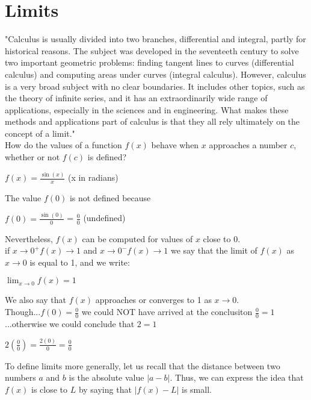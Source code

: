 \documentclass{article}
\begin{document}
\section* {Limits}

"Calculus is usually divided into two branches, differential and integral, partly for historical reasons. The subject was developed in the seventeeth century to solve two important geometric problems: finding tangent lines to curves (differential calculus) and computing areas under curves (integral calculus). However, calculus is a very broad subject with no clear boundaries. It includes other topics, such as the theory of infinite series, and it has an extraordinarily wide range of applications, especially in the sciences and in engineering. What makes these methods and applications part of calculus is that they all rely ultimately on the concept of a limit."\\

\noindent How do the values of a function $f(x)$ behave when $x$ approaches a number $c$, whether or not $f(c)$ is defined?\\

\begin{center}$f(x) = \frac{\sin(x)}{x}$ (x in radians)\end{center}
The value $f(0)$ is not defined because
\begin{center}$f(0) = \frac{\sin(0)}{0}$ = $\frac{0}{0}$ (undefined)\end{center}
Nevertheless, $f(x)$ can be computed for values of $x$ close to 0.\\

if $x \to 0^+ f(x) \to 1$ and $x \to 0^- f(x) \to 1$ we say that the limit of $f(x)$ as $x \to 0$ is equal to 1, and we write:
\begin{center}$\lim_{x \to 0}f(x) = 1$\end{center}
We also say that $f(x)$ approaches or converges to 1 as $x \to 0$.\\

\noindent Though...$f(0) = \frac{0}{0}$ we could NOT have arrived at the conclusiton $\frac{0}{0} = 1$...otherwise we could conclude that $2=1$
\begin{center}$2(\frac{0}{0}) = \frac{2(0)}{0} = \frac{0}{0}$\end{center}

To define limits more generally, let us recall that the distance between two numbers $a$ and $b$ is the absolute value $\left|a-b\right|$. Thus, we can express the idea that $f(x)$ is close to $L$ by saying that $\left|f(x) - L\right|$ is small.\\
\end{document}
